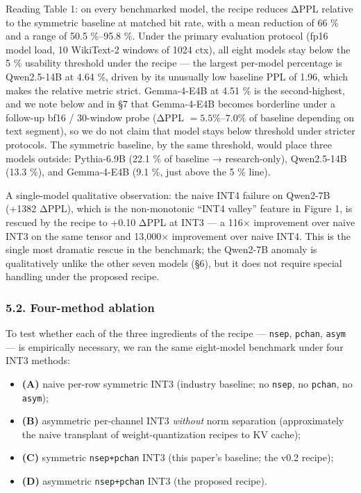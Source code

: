 \documentclass[
]{article}
\providecommand{\tightlist}{%
  \setlength{\itemsep}{0pt}\setlength{\parskip}{0pt}}
\begin{document}
Reading Table 1: on every benchmarked model, the recipe reduces ΔPPL
relative to the symmetric baseline at matched bit rate, with a mean
reduction of 66 \% and a range of 50.5 \%--95.8 \%. Under the primary
evaluation protocol (fp16 model load, 10 WikiText-2 windows of 1024
ctx), all eight models stay below the 5 \% usability threshold under the
recipe --- the largest per-model percentage is Qwen2.5-14B at 4.64 \%,
driven by its unusually low baseline PPL of 1.96, which makes the
relative metric strict. Gemma-4-E4B at 4.51 \% is the second-highest,
and we note below and in §7 that Gemma-4-E4B becomes borderline under a
follow-up bf16 / 30-window probe (ΔPPL \(= 5.5\%\)--\(7.0\%\) of
baseline depending on text segment), so we do not claim that model stays
below threshold under stricter protocols. The symmetric baseline, by the
same threshold, would place three models outside: Pythia-6.9B (22.1 \%
of baseline → research-only), Qwen2.5-14B (13.3 \%), and Gemma-4-E4B
(9.1 \%, just above the 5 \% line).

A single-model qualitative observation: the naive INT4 failure on
Qwen2-7B (+1382 ΔPPL), which is the non-monotonic ``INT4 valley''
feature in Figure 1, is rescued by the recipe to +0.10 ΔPPL at INT3 ---
a 116× improvement over naive INT3 on the same tensor and 13,000×
improvement over naive INT4. This is the single most dramatic rescue in
the benchmark; the Qwen2-7B anomaly is qualitatively unlike the other
seven models (§6), but it does not require special handling under the
proposed recipe.

\subsubsection{5.2. Four-method ablation}\label{four-method-ablation}

To test whether each of the three ingredients of the recipe ---
\texttt{nsep}, \texttt{pchan}, \texttt{asym} --- is empirically
necessary, we ran the same eight-model benchmark under four INT3
methods:

\begin{itemize}
\tightlist
\item
  \textbf{(A)} naive per-row symmetric INT3 (industry baseline; no
  \texttt{nsep}, no \texttt{pchan}, no \texttt{asym});
\item
  \textbf{(B)} asymmetric per-channel INT3 \emph{without} norm
  separation (approximately the naive transplant of weight-quantization
  recipes to KV cache);
\item
  \textbf{(C)} symmetric \texttt{nsep+pchan} INT3 (this paper's
  baseline; the v0.2 recipe);
\item
  \textbf{(D)} asymmetric \texttt{nsep+pchan} INT3 (the proposed
  recipe).
\end{itemize}
\end{document}

